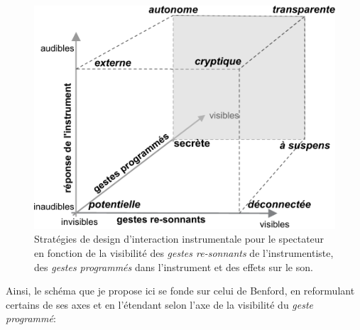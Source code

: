 \begin{figure}[H]
	\captionsetup{format=plain}%
	\centering
	\begin{minipage}[t]{0.8\textwidth}
		\includegraphics[width=\linewidth]{gfx/03_gesture/SubversiveCube.pdf}
		\caption[Stratégies de design d'interaction instrumentale pour le spectateur]{Stratégies de design d'interaction instrumentale pour le spectateur en fonction de la visibilité des \textit{gestes re-sonnants} de l'instrumentiste, des \textit{gestes programmés} dans l'instrument et des effets sur le son.}
		\label{fig:gesture:expressive-space}
	\end{minipage}
\end{figure}
\noindent Ainsi, le schéma que je propose ici se fonde sur celui de Benford, en reformulant certains de ses axes et en l'étendant selon l'axe de la visibilité du \textit{geste programmé}:
\vspace{-1em}
